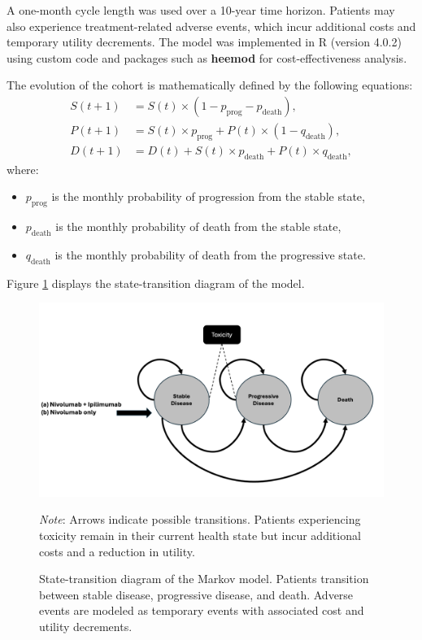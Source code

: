 \documentclass[preprint, 3p,
authoryear]{elsarticle} %
\begin{document}
A one-month cycle length was used over a 10-year time horizon. Patients
may also experience treatment-related adverse events, which incur
additional costs and temporary utility decrements. The model was
implemented in R (version 4.0.2) using custom code and packages such as
\textbf{heemod} for cost-effectiveness analysis.

The evolution of the cohort is mathematically defined by the following
equations: \[
\begin{aligned}
S(t+1) &= S(t) \times (1 - p_{\text{prog}} - p_{\text{death}}), \\
P(t+1) &= S(t) \times p_{\text{prog}} + P(t) \times (1 - q_{\text{death}}), \\
D(t+1) &= D(t) + S(t) \times p_{\text{death}} + P(t) \times q_{\text{death}},
\end{aligned}
\] where:

\begin{itemize}
\item
  \(p_{\text{prog}}\) is the monthly probability of progression from the
  stable state,
\item
  \(p_{\text{death}}\) is the monthly probability of death from the
  stable state,
\item
  \(q_{\text{death}}\) is the monthly probability of death from the
  progressive state.
\end{itemize}

Figure \hyperref[fig:model]{\ref{fig:model}} displays the
state-transition diagram of the model.

\begin{figure}[h]
\centering
\includegraphics[width=\textwidth]{../outputs/model.png}
\caption{State-transition diagram of the Markov model. Patients transition between stable disease, progressive disease, and death. Adverse events are modeled as temporary events with associated cost and utility decrements.}
\label{fig:model}
\begin{tablenotes}
\footnotesize
\item \textit{Note}: Arrows indicate possible transitions. Patients experiencing toxicity remain in their current health state but incur additional costs and a reduction in utility.
\end{tablenotes}
\end{figure}
\end{document}
